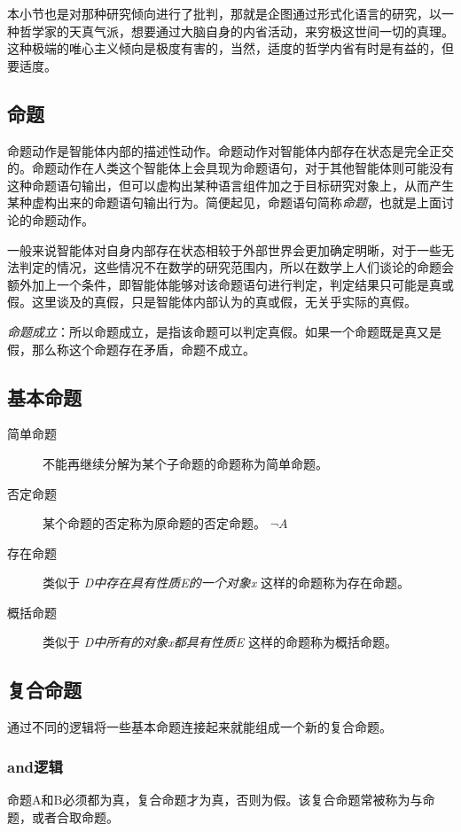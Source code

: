 \documentclass[12pt,oneside]{book}
\begin{document}
本小节也是对那种研究倾向进行了批判，那就是企图通过形式化语言的研究，以一种哲学家的天真气派，想要通过大脑自身的内省活动，来穷极这世间一切的真理。这种极端的唯心主义倾向是极度有害的，当然，适度的哲学内省有时是有益的，但要适度。

\subsection{命题}
命题动作是智能体内部的描述性动作。命题动作对智能体内部存在状态是完全正交的。命题动作在人类这个智能体上会具现为命题语句，对于其他智能体则可能没有这种命题语句输出，但可以虚构出某种语言组件加之于目标研究对象上，从而产生某种虚构出来的命题语句输出行为。简便起见，命题语句简称\emph{命题}，也就是上面讨论的命题动作。

一般来说智能体对自身内部存在状态相较于外部世界会更加确定明晰，对于一些无法判定的情况，这些情况不在数学的研究范围内，所以在数学上人们谈论的命题会额外加上一个条件，即智能体能够对该命题语句进行判定，判定结果只可能是真或假。这里谈及的真假，只是智能体内部认为的真或假，无关乎实际的真假。

\emph{命题成立}：所以命题成立，是指该命题可以判定真假。如果一个命题既是真又是假，那么称这个命题存在矛盾，命题不成立。


\subsection{基本命题}

\begin{description}
\item[简单命题] 不能再继续分解为某个子命题的命题称为简单命题。
\item[否定命题] 某个命题的否定称为原命题的否定命题。 $\neg A$
\item[存在命题] 类似于 \textit{D中存在具有性质E的一个对象x} 这样的命题称为存在命题。
\item[概括命题] 类似于 \textit{D中所有的对象x都具有性质E} 这样的命题称为概括命题。
\end{description}

\subsection{复合命题}
通过不同的逻辑将一些基本命题连接起来就能组成一个新的复合命题。


\subsubsection{and逻辑}
命题A和B必须都为真，复合命题才为真，否则为假。该复合命题常被称为与命题，或者合取命题。
\end{document}
